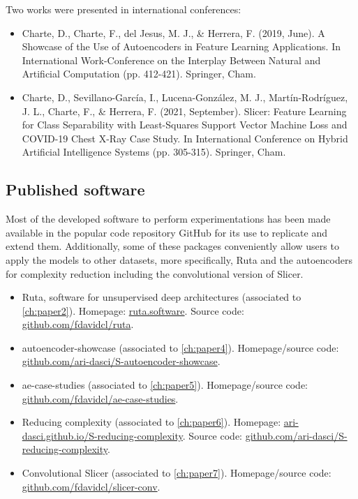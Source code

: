 Two works were presented in international conferences:

\begin{itemize}
    \item Charte, D., Charte, F., del Jesus, M. J., \& Herrera, F. (2019, June). A Showcase of the Use of Autoencoders in Feature Learning Applications. In International Work-Conference on the Interplay Between Natural and Artificial Computation (pp. 412-421). Springer, Cham.
    \item Charte, D., Sevillano-García, I., Lucena-González, M. J., Martín-Rodríguez, J. L., Charte, F., \& Herrera, F. (2021, September). Slicer: Feature Learning for Class Separability with Least-Squares Support Vector Machine Loss and COVID-19 Chest X-Ray Case Study. In International Conference on Hybrid Artificial Intelligence Systems (pp. 305-315). Springer, Cham.
\end{itemize}


\subsection{Published software}

Most of the developed software to perform experimentations has been made available in the popular code repository GitHub for its use to replicate and extend them. Additionally, some of these packages conveniently allow users to apply the models to other datasets, more specifically, Ruta and the autoencoders for complexity reduction including the convolutional version of Slicer.

\begin{itemize}
    \item Ruta, software for unsupervised deep architectures (associated to \autoref{ch:paper2}). Homepage: \href{https://ruta.software/}{ruta.software}. Source code: \href{https://github.com/fdavidcl/ruta}{github.com/fdavidcl/ruta}.
    \item autoencoder-showcase (associated to \autoref{ch:paper4}). Homepage/source code: \href{https://github.com/ari-dasci/S-autoencoder-showcase}{github.com/ari-dasci/S-autoencoder-showcase}.
    \item ae-case-studies (associated to \autoref{ch:paper5}). Homepage/source code: \href{https://github.com/fdavidcl/ae-case-studies}{github.com/fdavidcl/ae-case-studies}.
    \item Reducing complexity (associated to \autoref{ch:paper6}). Homepage: \href{https://ari-dasci.github.io/S-reducing-complexity/}{ari-dasci.github.io/S-reducing-complexity}. Source code: \href{https://github.com/ari-dasci/S-reducing-complexity}{github.com/ari-dasci/S-reducing-complexity}.
    \item Convolutional Slicer (associated to \autoref{ch:paper7}). Homepage/source code: \href{https://github.com/fdavidcl/slicer-conv}{github.com/fdavidcl/slicer-conv}.
\end{itemize}

